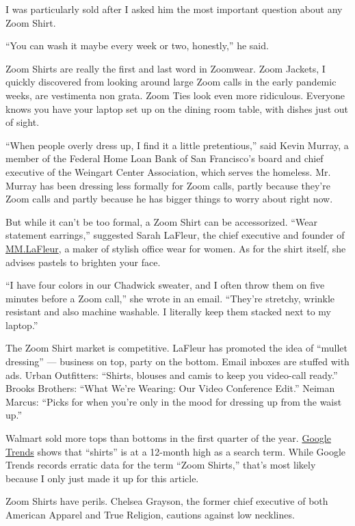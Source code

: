 I was particularly sold after I asked him the most important question
about any Zoom Shirt.

``You can wash it maybe every week or two, honestly,'' he said.

Zoom Shirts are really the first and last word in Zoomwear. Zoom
Jackets, I quickly discovered from looking around large Zoom calls in
the early pandemic weeks, are vestimenta non grata. Zoom Ties look even
more ridiculous. Everyone knows you have your laptop set up on the
dining room table, with dishes just out of sight.

``When people overly dress up, I find it a little pretentious,'' said
Kevin Murray, a member of the Federal Home Loan Bank of San Francisco's
board and chief executive of the Weingart Center Association, which
serves the homeless. Mr. Murray has been dressing less formally for Zoom
calls, partly because they're Zoom calls and partly because he has
bigger things to worry about right now.

But while it can't be too formal, a Zoom Shirt can be accessorized.
``Wear statement earrings,'' suggested Sarah LaFleur, the chief
executive and founder of \href{https://mmlafleur.com/}{MM.LaFleur}, a
maker of stylish office wear for women. As for the shirt itself, she
advises pastels to brighten your face.

``I have four colors in our Chadwick sweater, and I often throw them on
five minutes before a Zoom call,'' she wrote in an email. ``They're
stretchy, wrinkle resistant and also machine washable. I literally keep
them stacked next to my laptop.''

The Zoom Shirt market is competitive. LaFleur has promoted the idea of
``mullet dressing'' --- business on top, party on the bottom. Email
inboxes are stuffed with ads. Urban Outfitters: ``Shirts, blouses and
camis to keep you video-call ready.'' Brooks Brothers: ``What We're
Wearing: Our Video Conference Edit.'' Neiman Marcus: ``Picks for when
you're only in the mood for dressing up from the waist up.''

Walmart sold more tops than bottoms in the first quarter of the year.
\href{https://trends.google.com/trends/explore?geo=US\&q=shirts,pants}{Google
Trends} shows that ``shirts'' is at a 12-month high as a search term.
While Google Trends records erratic data for the term ``Zoom Shirts,''
that's most likely because I only just made it up for this article.

Zoom Shirts have perils. Chelsea Grayson, the former chief executive of
both American Apparel and True Religion, cautions against low necklines.

